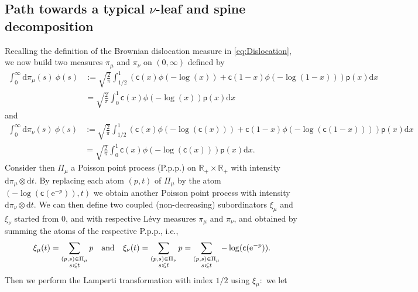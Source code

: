 \documentclass[11pt]{article}
\newcommand{\pp}{\mathsf{p}}
\newcommand{\cc}{\mathsf{c}}
\newcommand{\ff}{\cc}
\renewcommand{\leq}{\leqslant}
\newcommand{\dd}{\mathrm{d}}
\begin{document}
\subsection{Path towards a typical $\nu$-leaf and spine decomposition}
Recalling the definition of the Brownian dislocation measure in \eqref{eq:Dislocation}, we now build two measures $\pi_\mu$ and $\pi_\nu$ on $(0,\infty)$ defined by
\begin{align*}
\int_{0}^{\infty} \mathrm{d} \pi_\mu(s) \  \phi(s) &:= \sqrt{\frac{2}{\pi}} \int_{1/2}^{1} \left(\ff(x) \phi(-\log (x)) + \ff(1-x) \phi(-\log (1-x))\right)\pp(x)\dd x \\
&= \sqrt{\frac{2}{\pi}} \int_0^{1}  \ff(x) \phi\left(-\log (x)\right) \pp(x)\dd x
\end{align*} 
and
\begin{align*}  \int_{0}^{\infty} \mathrm{d} \pi_\nu(s) \  \phi(s) &:= \sqrt{\frac{2}{\pi}} \int_{1/2}^{1} \left(\ff(x) \phi(-\log (\ff(x))) + \ff(1-x) \phi(-\log (\ff(1-x)))\right)\pp(x)\dd x \\
&= \sqrt{\frac{2}{\pi}} \int_0^{1}  \ff(x) \phi\left(-\log ( \ff(x))\right)\pp(x)\dd x.
\end{align*} 
Consider then $\Pi_\mu$  a Poisson point process (P.p.p.) on $ \mathbb{R}_+ \times \mathbb{R}_+$ with intensity $ \mathrm{d} \pi_\mu \otimes \mathrm{d}t$. By replacing each atom $(p,t)$ of $\Pi_\mu$ by the atom $(-\log(\ff ( \mathrm{e}^{-p})),t)$ we obtain another Poisson point process with intensity $ \mathrm{d}\pi_\nu \otimes \mathrm{d}t$. We can then define two coupled (non-decreasing) subordinators $\xi_\mu$ and $\xi_\nu$  started from $0$, and with respective L\'evy measures $\pi_\mu$ and $\pi_\nu$, and obtained by summing the atoms of the respective P.p.p., i.e.,
\begin{equation}\label{defxi}
 \xi_\mu(t) = \sum_{\begin{subarray}{c}(p,s) \in \Pi_\mu \\ s \leq t\end{subarray}} p \quad \mbox{and} \quad \xi_\nu(t) = \sum_{\begin{subarray}{c}(p,s) \in \Pi_\nu \\ s \leq t \end{subarray}} p = \sum_{\begin{subarray}{c}(p,s) \in \Pi_\mu \\ s \leq t\end{subarray}} -\log(\ff ( \mathrm{e}^{-p})).\end{equation} 
Then we perform the Lamperti transformation with index $1/2$ using $\xi_\mu:$ we let
\end{document}
